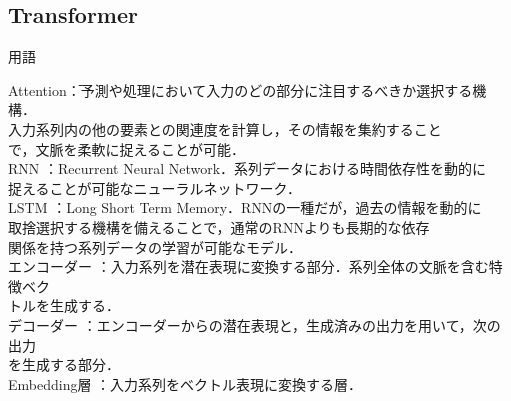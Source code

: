 \documentclass[dvipdfmx]{jreport}
\begin{document}
\subsection{Transformer}
\begin{itembox}[l]{\large{用語}}
    \begin{tabbing}
        \hspace{15pt} \raisebox{0.5ex}{\tiny $\bullet$} Attention\hspace{68pt}\=：予測や処理において入力のどの部分に注目するべきか選択する機構．\\[0.5em]\>\hspace{6.5pt}入力系列内の他の要素との関連度を計算し，その情報を集約すること\\[0.5em]\>\hspace{6.5pt}で，文脈を柔軟に捉えることが可能．\\[0.5em]
        \hspace{15pt} \raisebox{0.5ex}{\tiny $\bullet$} RNN \>：Recurrent Neural Network．系列データにおける時間依存性を動的に\\[0.5em]\>\hspace{6.5pt}捉えることが可能なニューラルネットワーク．\\[0.5em]
        \hspace{15pt} \raisebox{0.5ex}{\tiny $\bullet$} LSTM \>：Long Short Term Memory．RNNの一種だが，過去の情報を動的に\\[0.5em]\>\hspace{6.5pt}取捨選択する機構を備えることで，通常のRNNよりも長期的な依存\\[0.5em]\>\hspace{6.5pt}関係を持つ系列データの学習が可能なモデル．\\[0.5em]
        \hspace{15pt} \raisebox{0.5ex}{\tiny $\bullet$} エンコーダー \>：入力系列を潜在表現に変換する部分．系列全体の文脈を含む特徴ベク\\[0.5em]\>\hspace{6.5pt}トルを生成する．\\[0.5em]
        \hspace{15pt} \raisebox{0.5ex}{\tiny $\bullet$} デコーダー \>：エンコーダーからの潜在表現と，生成済みの出力を用いて，次の出力\\[0.5em]\>\hspace{6.5pt}を生成する部分．\\[0.5em]
        \hspace{15pt} \raisebox{0.5ex}{\tiny $\bullet$} Embedding層 \>：入力系列をベクトル表現に変換する層．\\[0.5em]

\end{tabbing}
\end{itembox}
\end{document}
